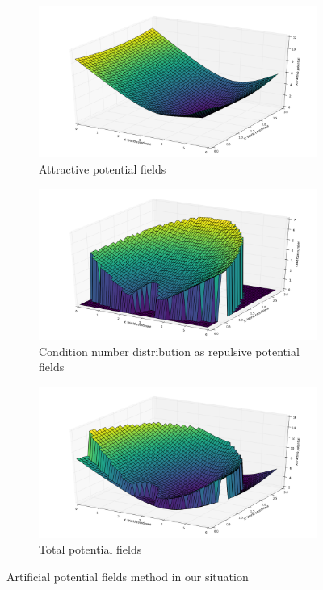 \begin{figure}[h]
  \centering
  \begin{subfigure}[b]{0.75\textwidth}
    \includegraphics[width=\textwidth]{./fig/Attractive_potential.png}
    \caption{Attractive potential fields}
  \end{subfigure}
  \begin{subfigure}[b]{0.75\textwidth}
    \includegraphics[width=\textwidth]{./fig/condNum3Dbig.png}
    \caption{Condition number distribution as repulsive potential fields}
  \end{subfigure}
  \begin{subfigure}[b]{0.75\textwidth}
    \includegraphics[width=\textwidth]{./fig/total_potential.png}
    \caption{Total potential fields}
  \end{subfigure}
  \caption{Artificial potential fields method in our situation}
  \label{fig:total_potential}
\end{figure}

